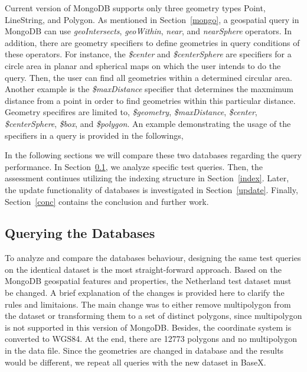 \documentclass[a4paper,12pt]{article}
\begin{document}
Current version of MongoDB supports only three geometry types Point, LineString, and Polygon. As mentioned in Section~\ref{mongo}, a geospatial query in MongoDB can use \textit{geoIntersects}, \textit{geoWithin}, \textit{near}, and \textit{nearSphere} operators. In addition, there are geometry specifiers to define geometries in query conditions of these operators. For instance, the \textit{\$center} and \textit{\$centerSphere} are specifiers for a circle area in planar and spherical maps on which the user intends to do the query. Then, the user can find all geometries within a determined circular area. Another example is the \textit{\$maxDistance} specifier that determines the maxmimum distance from a point in order to find geometries within this particular distance. Geometry specifires are limited to, \textit{\$geometry}, \textit{\$maxDistance}, \textit{\$center}, \textit{\$centerSphere}, \textit{\$box}, and \textit{\$polygon}. An example demonstrating the usage of the specifiers in a query is provided in the followings,
\vspace{10px}
 \vspace{10px}
 
In the following sections we will compare these two databases regarding the query performance. 
In Section~\ref{s.query}, we analyze specific test queries. Then, the assessment continues
utilizing the indexing structure in Section~\ref{index}. Later, the update functionality of databases is 
investigated in Section~\ref{update}. Finally, Section~\ref{conc} contains the conclusion and further work.

\subsection{Querying the Databases}
\label{s.query}
To analyze and compare the databases behaviour, designing the same test queries on the identical dataset is the most straight-forward approach. Based on the MongoDB geospatial features and properties, the Netherland test dataset must be changed. A brief explanation of the changes is provided here to clarify the rules and limitaions. The main change was to either remove multipolygon from the dataset or transforming them to a set of distinct polygons, since multipolygon is not supported in this version of MongoDB. Besides, the coordinate system is converted to WGS84. At the end, there are 12773 polygons and no multipolygon in the data file. Since the geometries are changed in database and the results would be different, we repeat all queries with the new dataset in BaseX.
\end{document}
